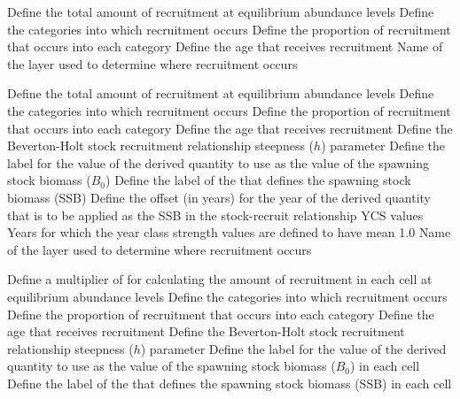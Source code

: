 \par\textbf{}\par
{} {Define the total amount of recruitment at equilibrium abundance levels}
 {Define the categories into which recruitment occurs}
 {Define the proportion of recruitment that occurs into each category}
 {Define the age that receives recruitment}
 {Name of the layer used to determine where recruitment occurs}
\par\textbf{}\par
{} {Define the total amount of recruitment at equilibrium abundance levels}
 {Define the categories into which recruitment occurs}
 {Define the proportion of recruitment that occurs into each category}
 {Define the age that receives recruitment}
 {Define the Beverton-Holt stock recruitment relationship steepness ($h$) parameter}
 {Define the  label for the value of the derived quantity  to use as the value of the spawning stock biomass ($B_0$)}
 {Define the label of the  that defines the spawning stock biomass (SSB)}
 {Define the offset (in years) for the year of the derived quantity that is to be applied as the SSB in the stock-recruit relationship}
 {YCS values}
 {Years for which the year class strength values are defined to have mean 1.0}
 {Name of the layer used to determine where recruitment occurs}
\par\textbf{}\par
{} {Define a multiplier of  for calculating the amount of recruitment in each cell at equilibrium abundance levels}
 {Define the categories into which recruitment occurs}
 {Define the proportion of recruitment that occurs into each category}
 {Define the age that receives recruitment}
 {Define the Beverton-Holt stock recruitment relationship steepness ($h$) parameter}
 {Define the  label for the value of the derived quantity  to use as the value of the spawning stock biomass ($B_0$) in each cell}
 {Define the label of the  that defines the spawning stock biomass (SSB) in each cell}
